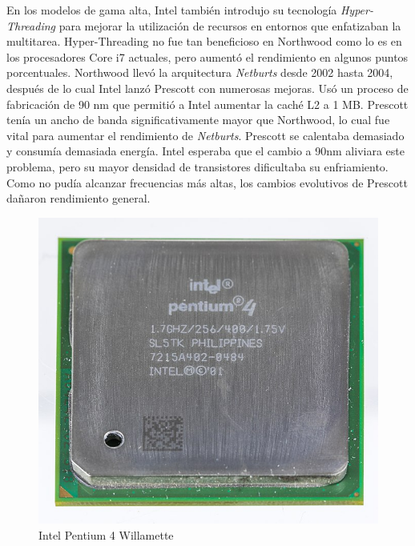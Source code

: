 En los modelos de gama alta, Intel también introdujo su tecnología \emph{Hyper-Threading} para mejorar la utilización de recursos en entornos que 
enfatizaban la multitarea. Hyper-Threading no fue tan beneficioso en Northwood como lo es en los procesadores Core i7 actuales, pero aumentó el 
rendimiento en algunos puntos porcentuales.
Northwood llevó la arquitectura \emph{Netburts} desde 2002 hasta 2004, después de lo cual Intel lanzó Prescott con numerosas mejoras. Usó un proceso de 
fabricación de 90 nm que permitió a Intel aumentar la caché L2 a 1 MB.  Prescott tenía un ancho de banda significativamente mayor que Northwood, 
lo cual fue vital para aumentar el rendimiento de \emph{Netburts}. Prescott se calentaba  demasiado y consumía demasiada energía. Intel esperaba que el 
cambio a 90nm aliviara este problema, pero su mayor densidad de transistores dificultaba su enfriamiento. Como no pudía alcanzar frecuencias más altas, 
los cambios evolutivos de Prescott dañaron  rendimiento general.
\begin{figure}[htb]
	\centering
	\includegraphics[scale = 0.15]{Graphics/Pentium_4_-_SL5TK-3056.jpg}
	\caption{Intel Pentium 4 Willamette}
	\label{fig:23}
\end{figure}

